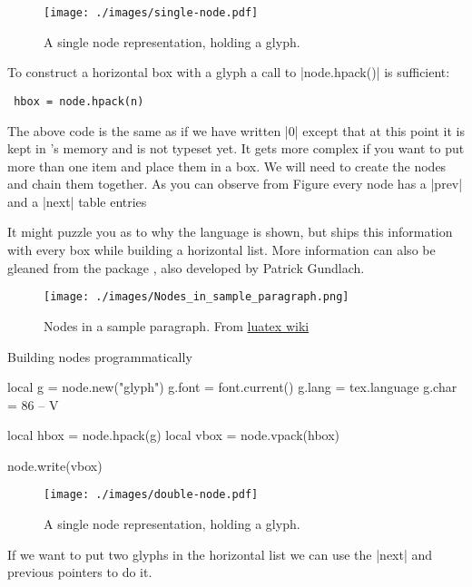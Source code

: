 \begin{figure}[ht]
\centering
\texttt{[image: ./images/single-node.pdf]}
\caption{A single node representation, holding a glyph.}
\end{figure}

To construct a horizontal box with a glyph a call to |node.hpack()| is sufficient:
\begin{verbatim}
 hbox = node.hpack(n)
\end{verbatim}

The above code is the same as if we have written |\hbox{0}| except that at this point it is kept in \tex's memory and is not typeset yet. It gets more complex if you want to put more than one item and place them in a box. We will need to create the nodes and chain them together. As you can observe from Figure every node has a |prev|  and a |next| table entries


It might puzzle you as to why the language is shown, but \tex ships this information with every box while building a horizontal list. More information can also be gleaned from the package , also developed by Patrick Gundlach. 

\begin{figure}[ht]
\centering
\texttt{[image: ./images/Nodes\_in\_sample\_paragraph.png]}
\caption{Nodes in a sample paragraph. From  \protect\href{http://wiki.luatex.org/images/Nodes_in_sample_paragraph.png}{luatex wiki}}
\end{figure}



\begin{texexample}{Building nodes programmatically}{}
\begin{luacode*}
local g = node.new("glyph")
g.font = font.current()
g.lang = tex.language
g.char = 86 -- V

local hbox = node.hpack(g)
local vbox = node.vpack(hbox)

node.write(vbox)
\end{luacode*}
\end{texexample}

\begin{figure}[ht]
\centering
\texttt{[image: ./images/double-node.pdf]}
\caption{A single node representation, holding a glyph.}
\end{figure}


If we want to put two glyphs in the horizontal list we can use the |next| and previous pointers to do it.

